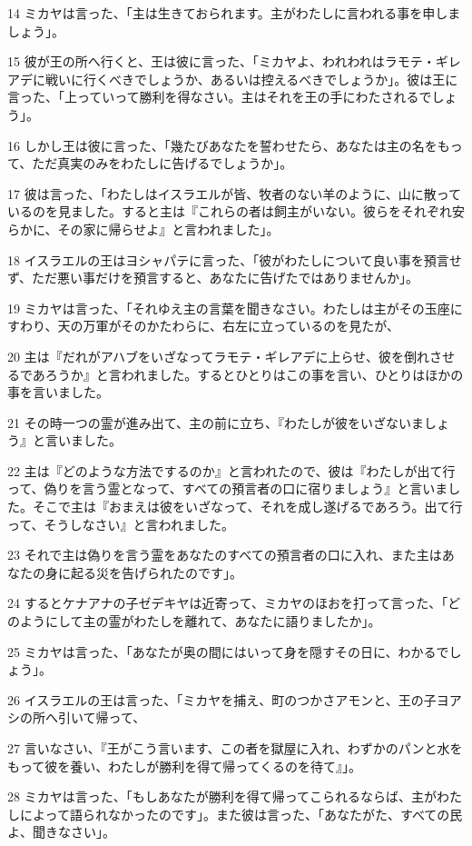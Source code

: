 \par 14 ミカヤは言った、「主は生きておられます。主がわたしに言われる事を申しましょう」。
\par 15 彼が王の所へ行くと、王は彼に言った、「ミカヤよ、われわれはラモテ・ギレアデに戦いに行くべきでしょうか、あるいは控えるべきでしょうか」。彼は王に言った、「上っていって勝利を得なさい。主はそれを王の手にわたされるでしょう」。
\par 16 しかし王は彼に言った、「幾たびあなたを誓わせたら、あなたは主の名をもって、ただ真実のみをわたしに告げるでしょうか」。
\par 17 彼は言った、「わたしはイスラエルが皆、牧者のない羊のように、山に散っているのを見ました。すると主は『これらの者は飼主がいない。彼らをそれぞれ安らかに、その家に帰らせよ』と言われました」。
\par 18 イスラエルの王はヨシャパテに言った、「彼がわたしについて良い事を預言せず、ただ悪い事だけを預言すると、あなたに告げたではありませんか」。
\par 19 ミカヤは言った、「それゆえ主の言葉を聞きなさい。わたしは主がその玉座にすわり、天の万軍がそのかたわらに、右左に立っているのを見たが、
\par 20 主は『だれがアハブをいざなってラモテ・ギレアデに上らせ、彼を倒れさせるであろうか』と言われました。するとひとりはこの事を言い、ひとりはほかの事を言いました。
\par 21 その時一つの霊が進み出て、主の前に立ち、『わたしが彼をいざないましょう』と言いました。
\par 22 主は『どのような方法でするのか』と言われたので、彼は『わたしが出て行って、偽りを言う霊となって、すべての預言者の口に宿りましょう』と言いました。そこで主は『おまえは彼をいざなって、それを成し遂げるであろう。出て行って、そうしなさい』と言われました。
\par 23 それで主は偽りを言う霊をあなたのすべての預言者の口に入れ、また主はあなたの身に起る災を告げられたのです」。
\par 24 するとケナアナの子ゼデキヤは近寄って、ミカヤのほおを打って言った、「どのようにして主の霊がわたしを離れて、あなたに語りましたか」。
\par 25 ミカヤは言った、「あなたが奥の間にはいって身を隠すその日に、わかるでしょう」。
\par 26 イスラエルの王は言った、「ミカヤを捕え、町のつかさアモンと、王の子ヨアシの所へ引いて帰って、
\par 27 言いなさい、『王がこう言います、この者を獄屋に入れ、わずかのパンと水をもって彼を養い、わたしが勝利を得て帰ってくるのを待て』」。
\par 28 ミカヤは言った、「もしあなたが勝利を得て帰ってこられるならば、主がわたしによって語られなかったのです」。また彼は言った、「あなたがた、すべての民よ、聞きなさい」。
